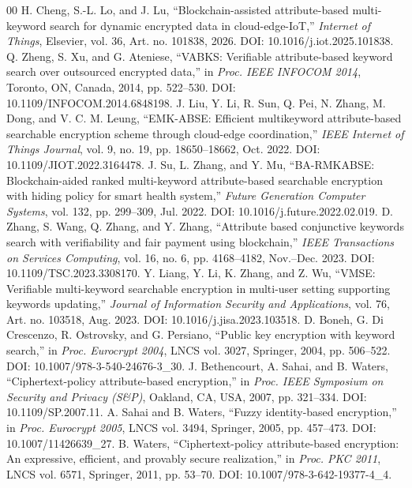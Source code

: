 \documentclass[conference]{IEEEtran}
\begin{document}
\begin{thebibliography}{00}
 H. Cheng, S.-L. Lo, and J. Lu, ``Blockchain-assisted attribute-based multi-keyword search for dynamic encrypted data in cloud-edge-IoT,'' \textit{Internet of Things}, Elsevier, vol. 36, Art. no. 101838, 2026. DOI: 10.1016/j.iot.2025.101838.
 Q. Zheng, S. Xu, and G. Ateniese, ``VABKS: Verifiable attribute-based keyword search over outsourced encrypted data,'' in \textit{Proc. IEEE INFOCOM 2014}, Toronto, ON, Canada, 2014, pp. 522--530. DOI: 10.1109/INFOCOM.2014.6848198.
 J. Liu, Y. Li, R. Sun, Q. Pei, N. Zhang, M. Dong, and V. C. M. Leung, ``EMK-ABSE: Efficient multikeyword attribute-based searchable encryption scheme through cloud-edge coordination,'' \textit{IEEE Internet of Things Journal}, vol. 9, no. 19, pp. 18650--18662, Oct. 2022. DOI: 10.1109/JIOT.2022.3164478.
 J. Su, L. Zhang, and Y. Mu, ``BA-RMKABSE: Blockchain-aided ranked multi-keyword attribute-based searchable encryption with hiding policy for smart health system,'' \textit{Future Generation Computer Systems}, vol. 132, pp. 299--309, Jul. 2022. DOI: 10.1016/j.future.2022.02.019.
 D. Zhang, S. Wang, Q. Zhang, and Y. Zhang, ``Attribute based conjunctive keywords search with verifiability and fair payment using blockchain,'' \textit{IEEE Transactions on Services Computing}, vol. 16, no. 6, pp. 4168--4182, Nov.--Dec. 2023. DOI: 10.1109/TSC.2023.3308170.
 Y. Liang, Y. Li, K. Zhang, and Z. Wu, ``VMSE: Verifiable multi-keyword searchable encryption in multi-user setting supporting keywords updating,'' \textit{Journal of Information Security and Applications}, vol. 76, Art. no. 103518, Aug. 2023. DOI: 10.1016/j.jisa.2023.103518.
 D. Boneh, G. Di Crescenzo, R. Ostrovsky, and G. Persiano, ``Public key encryption with keyword search,'' in \textit{Proc. Eurocrypt 2004}, LNCS vol. 3027, Springer, 2004, pp. 506--522. DOI: 10.1007/978-3-540-24676-3\_30.
 J. Bethencourt, A. Sahai, and B. Waters, ``Ciphertext-policy attribute-based encryption,'' in \textit{Proc. IEEE Symposium on Security and Privacy (S\&P)}, Oakland, CA, USA, 2007, pp. 321--334. DOI: 10.1109/SP.2007.11.
 A. Sahai and B. Waters, ``Fuzzy identity-based encryption,'' in \textit{Proc. Eurocrypt 2005}, LNCS vol. 3494, Springer, 2005, pp. 457--473. DOI: 10.1007/11426639\_27.
 B. Waters, ``Ciphertext-policy attribute-based encryption: An expressive, efficient, and provably secure realization,'' in \textit{Proc. PKC 2011}, LNCS vol. 6571, Springer, 2011, pp. 53--70. DOI: 10.1007/978-3-642-19377-4\_4.

\end{thebibliography}
\end{document}
